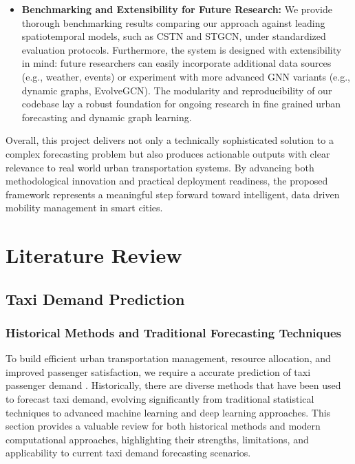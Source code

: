 \documentclass{article}
\begin{document}
\begin{itemize}
  \item \textbf{Benchmarking and Extensibility for Future Research:}  
  We provide thorough benchmarking results comparing our approach against leading spatiotemporal models, such as CSTN and STGCN, under standardized evaluation protocols. Furthermore, the system is designed with extensibility in mind: future researchers can easily incorporate additional data sources (e.g., weather, events) or experiment with more advanced GNN variants (e.g., dynamic graphs, EvolveGCN). The modularity and reproducibility of our codebase lay a robust foundation for ongoing research in fine grained urban forecasting and dynamic graph learning.
\end{itemize}

Overall, this project delivers not only a technically sophisticated solution to a complex forecasting problem but also produces actionable outputs with clear relevance to real world urban transportation systems. By advancing both methodological innovation and practical deployment readiness, the proposed framework represents a meaningful step forward toward intelligent, data driven mobility management in smart cities.


\section{Literature Review}

\subsection{Taxi Demand Prediction}

\subsubsection{Historical Methods and Traditional Forecasting Techniques}

To build efficient urban transportation management, resource allocation, and improved passenger satisfaction, we require a accurate prediction of taxi passenger demand \cite{zhao_2020_predicting}. Historically, there are diverse methods that have been used to forecast taxi demand, evolving significantly from traditional statistical techniques to advanced machine learning and deep learning approaches. This section provides a valuable review for both historical methods and modern computational approaches, highlighting their strengths, limitations, and applicability to current taxi demand forecasting scenarios.
\end{document}
